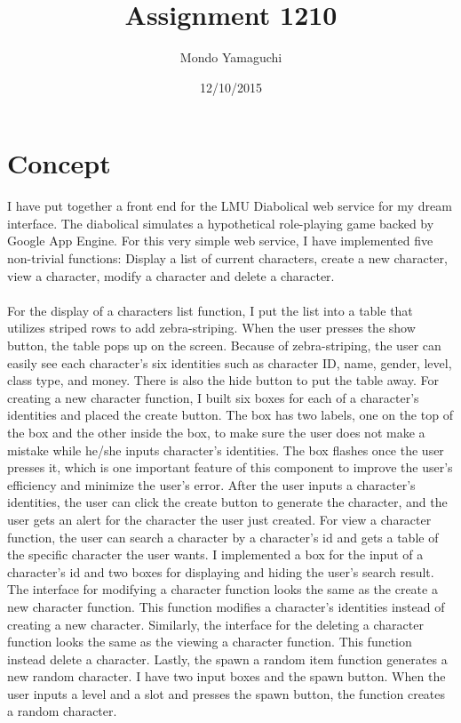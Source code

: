 \documentclass[100pt]{article}
\title{\Large{Assignment 1210}}
\author{\Large{Mondo Yamaguchi}}
\date{\Large{12/10/2015}}
\begin{document}
\maketitle


\section{\Large{Concept}}
\large{I have put together a front end for the LMU Diabolical web service for my dream interface. The diabolical simulates a hypothetical role-playing game backed by Google App Engine. For this very simple web service, I have implemented five non-trivial functions: Display a list of current characters, create a new character, view a character, modify a character and delete a character. 
\\\\
For the display of a characters list function, I put the list into a table that utilizes striped rows to add zebra-striping. When the user presses the show button, the table pops up on the screen. Because of zebra-striping, the user can easily see each character's six identities such as character ID, name, gender, level, class type, and money. There is also the hide button to put the table away. For creating a new character function, I built six boxes for each of a character's identities and placed the create button. The box has two labels, one on the top of the box and the other inside the box, to make sure the user does not make a mistake while he/she inputs character's identities. The box flashes once the user presses it, which is one important feature of this component to improve the user's efficiency and minimize the user's error. After the user inputs a character's identities, the user can click the create button to generate the character, and the user gets an alert for the character the user just created. For view a character function, the user can search a character by a character's id and gets a table of the specific character the user wants. I implemented a box for the input of a character's id and two boxes for displaying and hiding the user's search result. The interface for modifying a character function looks the same as the create a new character function. This function modifies a character's identities instead of creating a new character. Similarly, the interface for the deleting a character function looks the same as the viewing a character function. This function instead delete a character. Lastly, the spawn a random item function generates a new random character. I have two input boxes and the spawn button. When the user inputs a level and a slot and presses the spawn button, the function creates a random character.
\\\\

}
\label{Concept}
\end{document}
